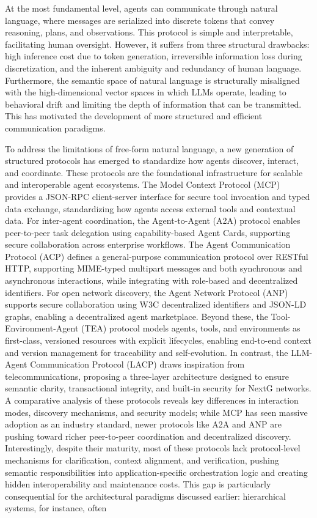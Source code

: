 \documentclass[11pt]{article}
\begin{document}
At the most fundamental level, agents can communicate through natural language, where messages are serialized into discrete tokens that convey reasoning, plans, and observations. This protocol is simple and interpretable, facilitating human oversight. However, it suffers from three structural drawbacks: high inference cost due to token generation, irreversible information loss during discretization, and the inherent ambiguity and redundancy of human language. \cite{ref63} Furthermore, the semantic space of natural language is structurally misaligned with the high-dimensional vector spaces in which LLMs operate, leading to behavioral drift and limiting the depth of information that can be transmitted. \cite{ref8} This has motivated the development of more structured and efficient communication paradigms.

To address the limitations of free-form natural language, a new generation of structured protocols has emerged to standardize how agents discover, interact, and coordinate. These protocols are the foundational infrastructure for scalable and interoperable agent ecosystems. The Model Context Protocol (MCP) provides a JSON-RPC client-server interface for secure tool invocation and typed data exchange, standardizing how agents access external tools and contextual data. \cite{ref64} For inter-agent coordination, the Agent-to-Agent (A2A) protocol enables peer-to-peer task delegation using capability-based Agent Cards, supporting secure collaboration across enterprise workflows. \cite{ref64} The Agent Communication Protocol (ACP) defines a general-purpose communication protocol over RESTful HTTP, supporting MIME-typed multipart messages and both synchronous and asynchronous interactions, while integrating with role-based and decentralized identifiers. \cite{ref64} For open network discovery, the Agent Network Protocol (ANP) supports secure collaboration using W3C decentralized identifiers and JSON-LD graphs, enabling a decentralized agent marketplace. \cite{ref64,ref65} Beyond these, the Tool-Environment-Agent (TEA) protocol models agents, tools, and environments as first-class, versioned resources with explicit lifecycles, enabling end-to-end context and version management for traceability and self-evolution. \cite{ref66} In contrast, the LLM-Agent Communication Protocol (LACP) draws inspiration from telecommunications, proposing a three-layer architecture designed to ensure semantic clarity, transactional integrity, and built-in security for NextG networks. \cite{ref67} A comparative analysis of these protocols reveals key differences in interaction modes, discovery mechanisms, and security models; while MCP has seen massive adoption as an industry standard, newer protocols like A2A and ANP are pushing toward richer peer-to-peer coordination and decentralized discovery. \cite{ref64,ref68} Interestingly, despite their maturity, most of these protocols lack protocol-level mechanisms for clarification, context alignment, and verification, pushing semantic responsibilities into application-specific orchestration logic and creating hidden interoperability and maintenance costs. \cite{ref69} This gap is particularly consequential for the architectural paradigms discussed earlier: hierarchical systems, for instance, often 
\end{document}
